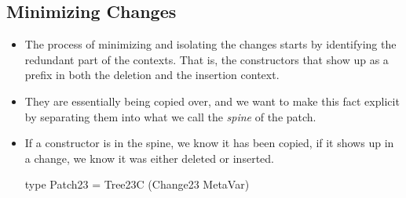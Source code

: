\subsection{Minimizing Changes}
\begin{itemize}
    \item The process of minimizing and isolating the changes starts by identifying the redundant part of the contexts. That is, the constructors that show up as a prefix in both the deletion and the insertion context.
    \item They are essentially being copied over, and we want to make this fact explicit by separating them into what we call the \textit{spine} of the patch.
    \item If a constructor is in the spine, we know it has been copied, if it shows up in a change, we know it was either deleted or inserted.
    \begin{haskell}
        type Patch23 = Tree23C (Change23 MetaVar)


\end{haskell}
\end{itemize}
